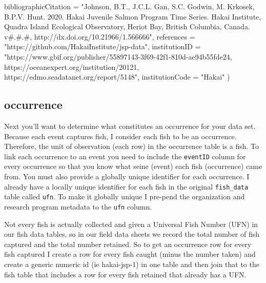\documentclass[
]{book}
\newenvironment{Shaded}{\begin{snugshade}}{\end{snugshade}}
\newcommand{\AttributeTok}[1]{\textcolor[rgb]{0.77,0.63,0.00}{#1}}
\newcommand{\NormalTok}[1]{#1}
\newcommand{\StringTok}[1]{\textcolor[rgb]{0.31,0.60,0.02}{#1}}
\begin{document}
\begin{Shaded}
\begin{Highlighting}[]
                \AttributeTok{bibliographicCitation =} \StringTok{"Johnson, B.T., J.C.L. Gan, S.C. Godwin, M. Krkosek, B.P.V. Hunt. 2020. Hakai Juvenile Salmon Program Time Series. Hakai Institute, Quadra Island Ecological Observatory, Heriot Bay, British Columbia, Canada. v\#.\#.\#, http://dx.doi.org/10.21966/1.566666"}\NormalTok{,}
                \AttributeTok{references =} \StringTok{"https://github.com/HakaiInstitute/jsp{-}data"}\NormalTok{,}
                \AttributeTok{institutionID =} \StringTok{"https://www.gbif.org/publisher/55897143{-}3f69{-}42f1{-}810d{-}ae94b55fde24, https://oceanexpert.org/institution/20121, https://edmo.seadatanet.org/report/5148"}\NormalTok{,}
                \AttributeTok{institutionCode =} \StringTok{"Hakai"}
\NormalTok{               ) }
\end{Highlighting}
\end{Shaded}

\hypertarget{occurrence}{%
\subsection{occurrence}\label{occurrence}}

Next you'll want to determine what constitutes an occurrence for your data set. Because each event captures fish, I consider each fish to be an occurrence. Therefore, the unit of observation (each row) in the occurrence table is a fish. To link each occurrence to an event you need to include the \texttt{eventID} column for every occurrence so that you know what seine (event) each fish (occurrence) came from. You must also provide a globally unique identifier for each occurrence. I already have a locally unique identifier for each fish in the original \texttt{fish\_data} table called \texttt{ufn}. To make it globally unique I pre-pend the organization and research program metadata to the \texttt{ufn} column.

Not every fish is actually collected and given a Universal Fish Number (UFN) in our fish data tables, so in our field data sheets we record the total number of fish captured and the total number retained. So to get an occurrence row for every fish captured I create a row for every fish caught (minus the number taken) and create a generic numeric id (ie hakai-jsp-1) in one table and then join that to the fish table that includes a row for every fish retained that already has a UFN.
\end{document}
